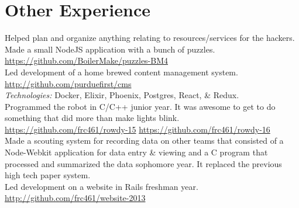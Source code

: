 \documentclass[11pt,letter,sans]{moderncv}
\begin{document}
\section{Other Experience}
Helped plan and organize anything relating to resources/services for the hackers.
Made a small NodeJS application with a bunch of puzzles. \url{https://github.com/BoilerMake/puzzles-BM4}
\\
Led development of a home brewed content management system. \url{http://github.com/purduefirst/cms}
\\
\textit{Technologies:} Docker, Elixir, Phoenix, Postgres, React, \& Redux.
\\
Programmed the robot in C/C++ junior year.
It was awesome to get to do something that did more than make lights blink.
\url{https://github.com/frc461/rowdy-15} \url{https://github.com/frc461/rowdy-16}
\\
Made a scouting system for recording data on other teams that consisted of a Node-Webkit application for data entry \& viewing and a C program that processed and summarized the data sophomore year.
It replaced the previous high tech paper system.
\\
Led development on a website in Rails freshman year. \url{http://github.com/frc461/website-2013}
\\
\end{document}

